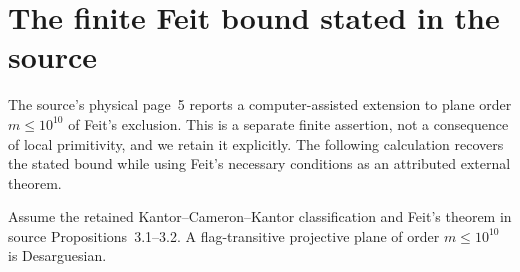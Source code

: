 \section{The finite Feit bound stated in the source}
The source's physical page~5 reports a computer-assisted extension to
plane order $m\leq10^{10}$ of Feit's exclusion. This is a separate finite
assertion, not a consequence of local primitivity, and we retain it explicitly.
The following calculation recovers the stated bound while using Feit's
necessary conditions as an attributed external theorem.

\begin{proposition}\label{feitbound}
Assume the retained Kantor--Cameron--Kantor classification and Feit's theorem
in source Propositions~3.1--3.2. A flag-transitive projective plane of order
$m\leq10^{10}$ is Desarguesian.
\end{proposition}
